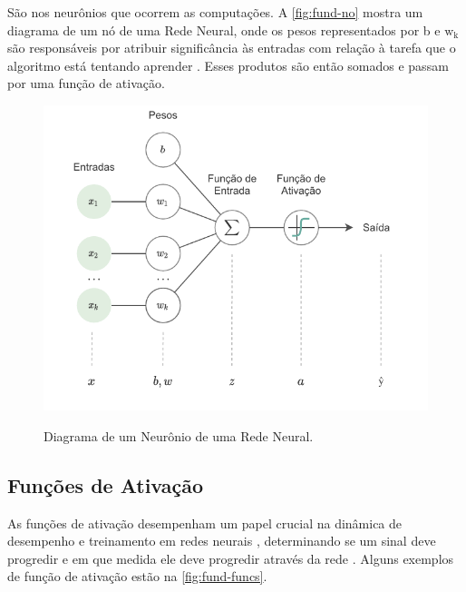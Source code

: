 São nos neurônios que ocorrem as computações. A \autoref{fig:fund-no} mostra um diagrama de um nó de uma Rede Neural, onde os pesos representados por b e $\mathrm{w_k}$ são responsáveis por atribuir significância às entradas com relação à tarefa que o algoritmo está tentando aprender \cite{ref:Nicholson}. Esses produtos são então somados e passam por uma função de ativação.

\begin{figure}[h!] %
  \centering
  \caption{Diagrama de um Neurônio de uma Rede Neural.}
  \includegraphics[scale=1.1]{img/img-fundamentacao-no.pdf}
  \label{fig:fund-no}
\end{figure}

\subsection{Funções de Ativação} \label{cap:fund-ia-rn-func}
As funções de ativação desempenham um papel crucial na dinâmica de desempenho e treinamento em redes neurais \cite{ref:Misra}, determinando se um sinal deve progredir e em que medida ele deve progredir através da rede \cite{ref:Nicholson}. Alguns exemplos de função de ativação estão na \autoref{fig:fund-funcs}.

